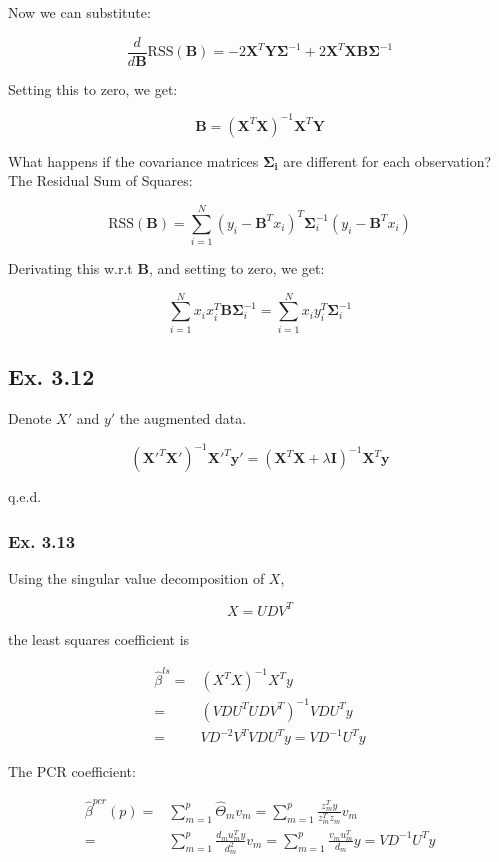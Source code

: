 \documentclass{article}
\begin{document}
Now we can substitute:

\[
\frac{d}{d\mathbf{B}} \text{RSS}(\mathbf{B}) = -2 \mathbf{X}^T \mathbf{Y} \mathbf{\Sigma}^{-1} + 2\mathbf{X}^T \mathbf{X} \mathbf{B} \mathbf{\Sigma}^{-1}
\]

Setting this to zero, we get:

\[
\mathbf{B} = (\mathbf{X}^T\mathbf{X})^{-1}\mathbf{X}^T\mathbf{Y}
\]

What happens if the covariance matrices $\mathbf{\Sigma_i}$ are different for each observation? The Residual Sum of Squares:

\[
\text{RSS}(\mathbf{B}) = \sum_{i=1}^{N} (y_i - \mathbf{B}^Tx_i)^T \mathbf{\Sigma}^{-1}_i (y_i - \mathbf{B}^Tx_i)
\]

Derivating this w.r.t $\mathbf{B}$, and setting to zero, we get:

\[
\sum_{i=1}^{N} x_i x^T_i \mathbf{B} \mathbf{\Sigma}^{-1}_i = \sum_{i=1}^{N} x_i y^T_i \mathbf{\Sigma}^{-1}_i
\]

\subsection{Ex. 3.12}
Denote $X'$ and $y'$ the augmented data.

\[
(\mathbf{X}'^{T}\mathbf{X}')^{-1}\mathbf{X}'^{T}\mathbf{y}' = (\mathbf{X}^{T}\mathbf{X} + \lambda \mathbf{I})^{-1}\mathbf{X}^{T}\mathbf{y}
\]

q.e.d.

\subsubsection{Ex. 3.13}

Using the singular value decomposition of $X$,

\[
X = UDV^T
\]

the least squares coefficient is

\[
\begin{split}
\hat{\beta}^{ls} =& (X^TX)^{-1}X^Ty\\
=& (VDU^T UDV^T)^{-1}VDU^Ty\\
=& VD^{-2}V^T VDU^Ty=VD^{-1}U^Ty
\end{split}
\]

The PCR coefficient:

\[
\begin{split}
    \hat{\beta}^{pcr}(p) =& \sum_{m=1}^p \hat{\Theta}_m v_m = \sum_{m=1}^p \frac{z^T_m y}{z^T_m z_m} v_m\\
    =& \sum_{m=1}^p \frac{d_m u^T_m y}{d^2_m} v_m =\sum_{m=1}^p \frac{v_mu^T_m}{d_m} y = VD^{-1}U^T y
\end{split}
\]
\end{document}
